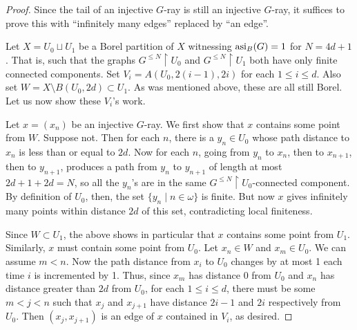 \documentclass[12pt]{article}
\newcommand{\0}{\varnothing}
\newcommand{\asi}{\textnormal{asi}}
\newcommand{\res}{\upharpoonright}
\begin{document}
\begin{proof}
Since the tail of an injective $G$-ray is still an injective $G$-ray, it suffices to prove this with ``infinitely many edges'' replaced by ``an edge''. 

Let $X = U_0 \sqcup U_1$ be a Borel partition of $X$ witnessing $\asi_B(G) = 1$ for $N = 4d+1$. That is, such that the graphs $G^{\leq N} \res U_0$ and $G^{\leq N} \res U_1$ both have only finite connected components. Set $V_i = A(U_0,2(i-1),2i)$ for each $1 \leq i \leq d$. Also set $W = X \setminus B(U_0,2d) \subset U_1$. As was mentioned above, these are all still Borel. Let us now show these $V_i$'s work.

Let $x = (x_n)$ be an injective $G$-ray. We first show that $x$ contains some point from $W$. Suppose not. Then for each $n$, there is a $y_n \in U_0$ whose path distance to $x_n$ is less than or equal to $2d$. Now for each $n$, going from $y_n$ to $x_n$, then to $x_{n+1}$, then to $y_{n+1}$, produces a path from $y_n$ to $y_{n+1}$ of length at most $2d+1+2d=N$, so all the $y_n$'s are in the same $G^{\leq N} \res U_0$-connected component. By definition of $U_0$, then, the set $\{y_n \mid n \in \omega\}$ is finite. But now $x$ gives infinitely many points within distance $2d$ of this set, contradicting local finiteness.

Since $W \subset U_1$, the above shows in particular that $x$ contains some point from $U_1$. Similarly, $x$ must contain some point from $U_0$. Let $x_n \in W$ and $x_m \in U_0$. We can assume $m < n$. Now the path distance from $x_i$ to $U_0$ changes by at most 1 each time $i$ is incremented by 1. Thus, since $x_m$ has distance 0 from $U_0$ and $x_n$ has distance greater than $2d$ from $U_0$, for each $1 \leq i \leq d$, there must be some $m < j < n$ such that $x_{j}$ and $x_{j+1}$ have distance $2i-1$ and $2i$ respectively from $U_0$. Then $(x_j,x_{j+1})$ is an edge of $x$ contained in $V_i$, as desired.

\end{proof}
\end{document}
